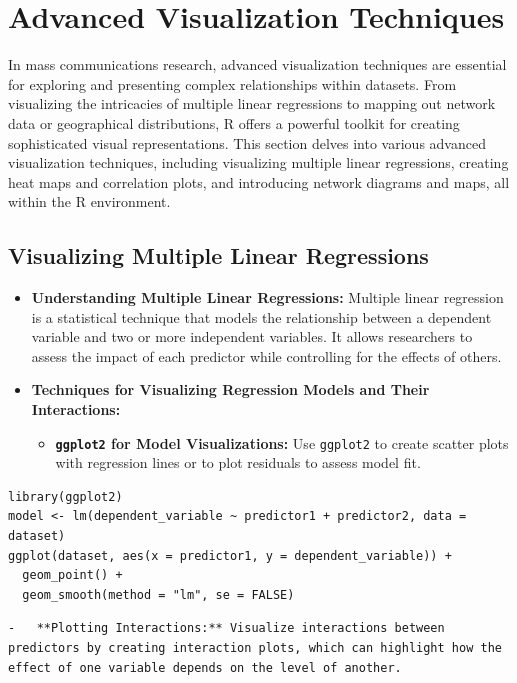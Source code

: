 \documentclass[
]{book}
\providecommand{\tightlist}{%
  \setlength{\itemsep}{0pt}\setlength{\parskip}{0pt}}
\begin{document}
\section{Advanced Visualization Techniques}\label{advanced-visualization-techniques}

In mass communications research, advanced visualization techniques are essential for exploring and presenting complex relationships within datasets. From visualizing the intricacies of multiple linear regressions to mapping out network data or geographical distributions, R offers a powerful toolkit for creating sophisticated visual representations. This section delves into various advanced visualization techniques, including visualizing multiple linear regressions, creating heat maps and correlation plots, and introducing network diagrams and maps, all within the R environment.

\subsection{Visualizing Multiple Linear Regressions}\label{visualizing-multiple-linear-regressions}

\begin{itemize}
\item
  \textbf{Understanding Multiple Linear Regressions:} Multiple linear regression is a statistical technique that models the relationship between a dependent variable and two or more independent variables. It allows researchers to assess the impact of each predictor while controlling for the effects of others.
\item
  \textbf{Techniques for Visualizing Regression Models and Their Interactions:}

  \begin{itemize}
  \tightlist
  \item
    \textbf{\texttt{ggplot2} for Model Visualizations:} Use \texttt{ggplot2} to create scatter plots with regression lines or to plot residuals to assess model fit.
  \end{itemize}
\end{itemize}

\begin{verbatim}
library(ggplot2)
model <- lm(dependent_variable ~ predictor1 + predictor2, data = dataset)
ggplot(dataset, aes(x = predictor1, y = dependent_variable)) + 
  geom_point() + 
  geom_smooth(method = "lm", se = FALSE)
\end{verbatim}

\begin{verbatim}
-   **Plotting Interactions:** Visualize interactions between predictors by creating interaction plots, which can highlight how the effect of one variable depends on the level of another.
\end{verbatim}
\end{document}
